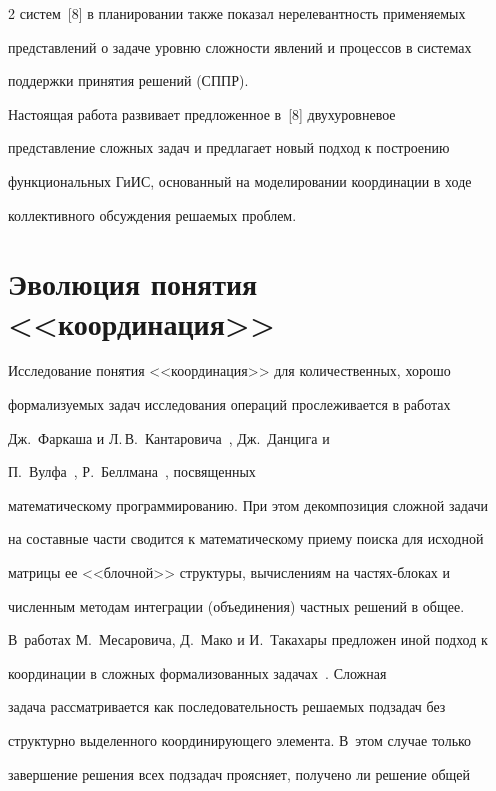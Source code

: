 \begin{multicols}{2}
систем~[8] в планировании также показал нерелевантность применяемых 


представлений о задаче уровню сложности явлений и процессов в системах 


поддержки принятия решений (СППР).


  


  Настоящая работа развивает предложенное в~[8] двухуровневое 


представление сложных задач и предлагает новый подход к построению 


функциональных ГиИС, основанный на моделировании координации в ходе 


коллективного обсуждения решаемых проблем.


  


\section{Эволюция понятия <<координация>>}


  


  Исследование понятия <<координация>> для количественных, хорошо 


формализуемых задач исследования операций прослеживается в работах 


Дж.~Фар\-ка\-ша и Л.\,В.~Кантаровича~\cite{7kol}, Дж.~Данцига и 


П.~Вулфа~\cite{9kol}, Р.~Беллмана~\cite{10kol}, посвященных 


математическому программированию. При этом декомпозиция сложной задачи 


на составные части сводится к математическому приему поиска для исходной 


матрицы ее <<блочной>> структуры, вычислениям на частях-блоках и 


численным методам интеграции (объединения) частных решений в общее. 


В~работах М.~Месаровича, Д.~Мако и И.~Такахары предложен иной подход к 


координации в сложных формализованных задачах~\cite{11kol}. Сложная 


задача рассматривается как последовательность решаемых подзадач без 


структурно выделенного координирующего элемента. В~этом случае только 


завершение решения всех подзадач проясняет, получено ли решение общей 



\end{multicols}
